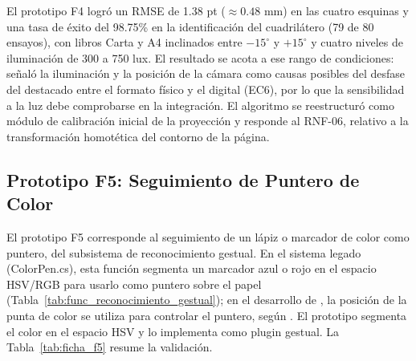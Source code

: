 El prototipo F4 logró un RMSE de 1.38 pt ($\approx 0.48$ mm) en las cuatro esquinas y una tasa de éxito del 98.75\% en la identificación del cuadrilátero (79 de 80 ensayos), con libros Carta y A4 inclinados entre $-15^\circ$ y $+15^\circ$ y cuatro niveles de iluminación de 300 a 750 lux. El resultado se acota a ese rango de condiciones: \cite{ibaceta2023evaluacion} señaló la iluminación y la posición de la cámara como causas posibles del desfase del destacado entre el formato físico y el digital (EC6), por lo que la sensibilidad a la luz debe comprobarse en la integración. El algoritmo se reestructuró como módulo de calibración inicial de la proyección y responde al RNF-06, relativo a la transformación homotética del contorno de la página.
 
\subsection{Prototipo F5: Seguimiento de Puntero de Color}
 
El prototipo F5 corresponde al seguimiento de un lápiz o marcador de color como puntero, del subsistema de reconocimiento gestual. En el sistema legado (ColorPen.cs), esta función segmenta un marcador azul o rojo en el espacio HSV/RGB para usarlo como puntero sobre el papel (Tabla~\ref{tab:func_reconocimiento_gestual}); en el desarrollo de \cite{contreras2019desarrollo}, la posición de la punta de color se utiliza para controlar el puntero, según \cite{ibaceta2023evaluacion}. El prototipo segmenta el color en el espacio HSV y lo implementa como plugin gestual. La Tabla~\ref{tab:ficha_f5} resume la validación.
 
